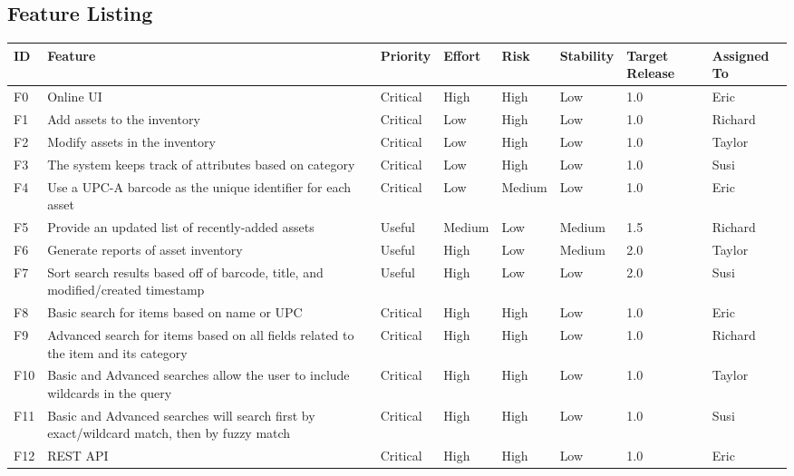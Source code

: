 \documentclass{article}
\begin{document}
\subsection{Feature Listing}
\begin{tabular}{ | p{0.15in} | p{2.0in} | p{0.5in} | p{0.5in} | p{0.5in} | p{0.6in} | p{0.5in} | p{0.65in} | }
\hline
\textbf{ID} & \textbf{Feature}\label{feature} & \textbf{Priority}\label{priority} & \textbf{Effort}\label{effort} & \textbf{Risk}\label{risk} & \textbf{Stability}\label{stability} & \textbf{Target Release}\label{target_release} & \textbf{Assigned To}\label{assigned_to} \\
\hline
\hline
F0 & Online UI & Critical & High & High & Low & 1.0 & Eric \\
\hline
F1 & Add assets to the inventory & Critical & Low & High & Low & 1.0 & Richard \\
\hline
F2 & Modify assets in the inventory & Critical & Low & High & Low & 1.0 & Taylor \\
\hline
F3 & The system keeps track of attributes based on category & Critical & Low & High & Low & 1.0 & Susi \\
\hline
F4 & Use a UPC-A barcode as the unique identifier for each asset\label{upc} & Critical & Low & Medium & Low & 1.0 & Eric \\
\hline
F5 & Provide an updated list of recently-added assets & Useful & Medium & Low & Medium & 1.5 & Richard \\
\hline
F6 & Generate reports of asset inventory & Useful & High & Low & Medium & 2.0 & Taylor \\
\hline
F7 & Sort search results based off of barcode, title, and modified/created timestamp & Useful & High & Low & Low & 2.0 & Susi \\
\hline
F8 & Basic search for items based on name or UPC & Critical & High & High & Low & 1.0 & Eric \\
\hline
F9 & Advanced search for items based on all fields related to the item and its category & Critical & High & High & Low & 1.0 & Richard \\
\hline
F10 & Basic and Advanced searches allow the user to include wildcards in the query & Critical & High & High & Low & 1.0 & Taylor \\
\hline
F11 & Basic and Advanced searches will search first by exact/wildcard match, then by fuzzy match & Critical & High & High & Low & 1.0 & Susi \\
\hline
F12 & REST API & Critical & High & High & Low & 1.0 & Eric \\
\hline
\end{tabular}\\
\end{document}
